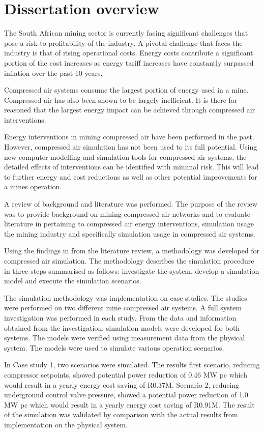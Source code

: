 	 \section{Dissertation overview}
	 The South African mining sector is currently facing significant challenges that pose a risk to profitability of the industry. A pivotal challenge that faces the industry is that of rising operational costs. Energy costs contribute a significant portion of the cost increases as energy tariff increases have constantly surpassed inflation over the past 10 years.
	 \par
	 Compressed air systems consume the largest portion of energy used in a mine. Compressed air has also been shown to be largely inefficient. It is there for reasoned that the largest energy impact can be achieved through compressed air interventions.
	 \par 
	 Energy interventions in mining compressed air have been performed in the past. However, compressed air simulation has not been used to its full potential. Using new computer modelling and simulation tools for compressed air systems, the detailed effects of interventions can be identified with minimal risk. This will lead to further energy and cost reductions as well as other potential improvements for a mines operation.
	 \par 
	 A review of background and literature was performed. The purpose of the review was to provide background on mining compressed air networks and to evaluate literature in pertaining to compressed air energy interventions, simulation usage the mining industry and specifically simulation usage in compressed air systems.
	 \par 
	 Using the findings in from the literature review, a methodology was developed for compressed air simulation. The methodology describes the simulation procedure in three steps summarised as follows: investigate the system, develop a simulation model and execute the simulation scenarios.
	 \par 
	 The simulation methodology was implementation on case studies. The studies were performed on two different mine compressed air systems. A full system investigation was performed in each study. From the data and information obtained from the investigation, simulation models were developed for both systems. The models were verified using measurement data from the physical system. The models were used to simulate various operation scenarios.
	 \par 
	 In Case study 1, two scenarios were simulated. The results first scenario, reducing compressor setpoints, showed potential power reduction of 0.46 MW \gls{pc} which would result in a yearly energy cost saving of R0.37M. Scenario 2, reducing underground control valve pressure, showed a potential power reduction of 1.0 MW \gls{pc} which would result in a yearly energy cost saving of R0.91M. The result of the simulation was validated by comparison with the actual results from implementation on the physical system.
